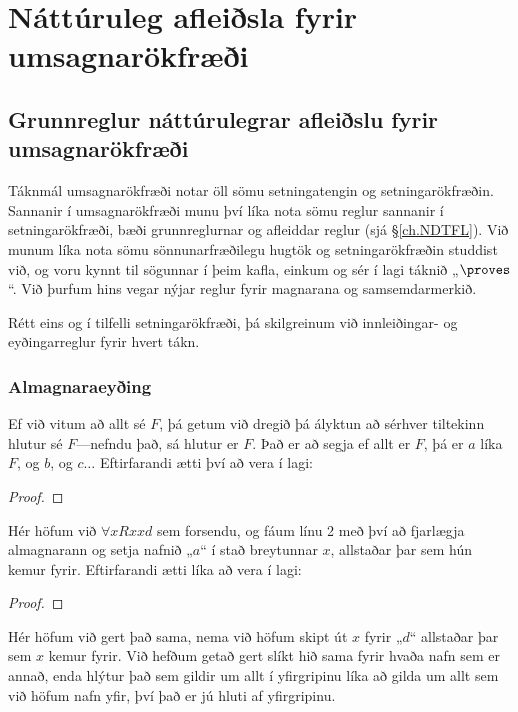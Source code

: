 \part{Náttúruleg afleiðsla fyrir umsagnarökfræði}
\label{ch.NDFOL}


\chapter{Grunnreglur náttúrulegrar afleiðslu fyrir umsagnarökfræði}\label{s:BasicFOL}

Táknmál umsagnarökfræði notar öll sömu setningatengin og setningarökfræðin. Sannanir í umsagnarökfræði munu því líka nota sömu reglur sannanir í setningarökfræði, bæði grunnreglurnar og afleiddar reglur (sjá \S\ref{ch.NDTFL}). Við munum líka nota sömu sönnunarfræðilegu hugtök og setningarökfræðin studdist við, og voru kynnt til sögunnar í þeim kafla, einkum og sér í lagi táknið „$\proves$“. Við þurfum hins vegar nýjar reglur fyrir magnarana og samsemdarmerkið.

Rétt eins og í tilfelli setningarökfræði, þá skilgreinum við innleiðingar- og eyðingarreglur fyrir hvert tákn. 

\section{Almagnaraeyðing}

Ef við vitum að allt sé $F$, þá getum við dregið þá ályktun að sérhver tiltekinn hlutur sé $F$---nefndu það, sá hlutur er $F$. Það er að segja ef allt er $F$, þá er $a$ líka $F$, og $b$, og $c\ldots$ Eftirfarandi ætti því að vera í lagi:

\begin{proof}
	 
\end{proof}
Hér höfum við $\forall xRxxd$ sem forsendu, og fáum línu 2 með því að fjarlægja almagnarann og setja nafnið „$a$“ í stað breytunnar $x$, allstaðar þar sem hún kemur fyrir. Eftirfarandi ætti líka að vera í lagi:
\begin{proof}
	 
\end{proof}
Hér höfum við gert það sama, nema við höfum skipt út $x$ fyrir „$d$“ allstaðar þar sem $x$ kemur fyrir. Við hefðum getað gert slíkt hið sama fyrir hvaða nafn sem er annað, enda hlýtur það sem gildir um allt í yfirgripinu líka að gilda um allt sem við höfum nafn yfir, því það er jú hluti af yfirgripinu.

